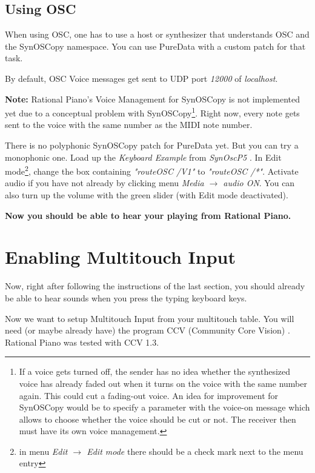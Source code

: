 \documentclass[12pt,a4paper,titlepage,oneside]{report}
\begin{document}
\subsection{Using OSC}

When using OSC, one has to use a host or synthesizer that understands OSC and the SynOSCopy namespace. You can use PureData \cite{bib:puredata} with a custom patch for that task.

By default, OSC Voice messages get sent to UDP port \textit{12000} of \textit{localhost}.

\textbf{Note:} Rational Piano's Voice Management for SynOSCopy is not implemented yet due to a conceptual problem with SynOSCopy\footnote{If a voice gets turned off, the sender has no idea whether the synthesized voice has already faded out when it turns on the voice with the same number again. This could cut a fading-out voice. An idea for improvement for SynOSCopy would be to specify a parameter with the voice-on message which allows to choose whether the voice should be cut or not. The receiver then must have its own voice management.}. Right now, every note gets sent to the voice with the same number as the MIDI note number.

There is no polyphonic SynOSCopy patch for PureData yet. But you can try a monophonic one. Load up the \textit{Keyboard Example} from \textit{SynOscP5} \cite{bib:synoscopy_keyboard_example}. In Edit mode\footnote{in menu \textit{Edit $\rightarrow$ Edit mode} there should be a check mark next to the menu entry}, change the box containing \textit{"routeOSC /V1"} to \textit{"routeOSC /*"}. Activate audio if you have not already by clicking menu \textit{Media $\rightarrow$ audio ON}. You can also turn up the volume with the green slider (with Edit mode deactivated).

\textbf{Now you should be able to hear your playing from Rational Piano.}


\section{Enabling Multitouch Input}
\label{sec:input}

Now, right after following the instructions of the last section, you should already be able to hear sounds when you press the typing keyboard keys.

Now we want to setup Multitouch Input from your multitouch table. You will need (or maybe already have) the program CCV (Community Core Vision) \cite{bib:ccv}. Rational Piano was tested with CCV 1.3.
\end{document}
